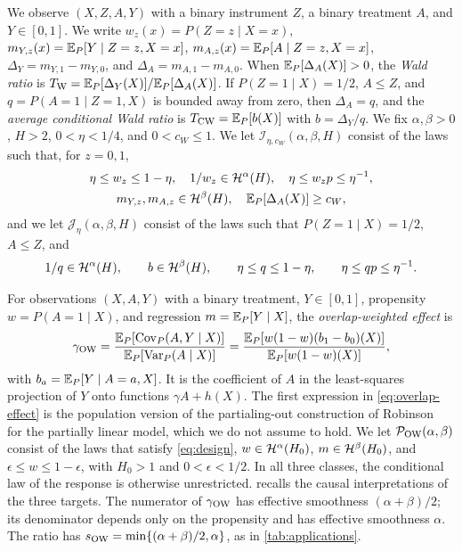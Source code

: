 We observe $(X,Z,A,Y)$ with a binary instrument $Z$, a binary treatment
$A$, and $Y\in[0,1]$.
We write $w_z(x)=P(Z=z\mid X=x)$,
$m_{Y,z}(x)=\mathbb E_P[Y\mid Z=z,X=x]$, $m_{A,z}(x)=\mathbb E_P[A\mid Z=z,X=x]$,
$\Delta_Y=m_{Y,1}-m_{Y,0}$, and $\Delta_A=m_{A,1}-m_{A,0}$. When
$\mathbb E_P[\Delta_A(X)]>0$, the \emph{Wald ratio} is
$T_{\rm W}=\mathbb E_P[\Delta_Y(X)]/\mathbb E_P[\Delta_A(X)]$. If $P(Z=1\mid X)=1/2$,
$A\le Z$, and $q=P(A=1\mid Z=1,X)$ is bounded away from zero, then
$\Delta_A=q$, and the \emph{average conditional Wald ratio} is
$T_{\rm CW}=\mathbb E_P[b(X)]$ with $b=\Delta_Y/q$. We fix $\alpha,\beta>0$,
$H>2$, $0<\eta<1/4$, and $0<c_W\le1$. We let
$\mathcal I_{\eta,c_W}(\alpha,\beta,H)$ consist of the laws such that,
for $z=0,1$,
\[
 \begin{gathered}
 \eta\le w_z\le1-\eta,\quad 1/w_z\in\mathcal H^\alpha(H),\quad
 \eta\le w_zp\le\eta^{-1},\\
 m_{Y,z},m_{A,z}\in\mathcal H^\beta(H),
 \quad \mathbb E_P[\Delta_A(X)]\ge c_W,
 \end{gathered}
\]
and we let $\mathcal J_\eta(\alpha,\beta,H)$ consist of the laws such
that $P(Z=1\mid X)=1/2$, $A\le Z$, and
\[
 1/q\in\mathcal H^\alpha(H),\qquad b\in\mathcal H^\beta(H),\qquad
 \eta\le q\le1-\eta,\qquad \eta\le qp\le\eta^{-1}.
\]

For observations $(X,A,Y)$ with a binary treatment, $Y\in[0,1]$,
propensity $w=P(A=1\mid X)$, and regression $m=\mathbb E_P[Y\mid X]$, the
\emph{overlap-weighted effect} is
\begin{equation}\label{eq:overlap-effect}
 \gamma_{\rm OW}=\frac{\mathbb E_P[\operatorname{Cov}_P(A,Y\mid X)]}{\mathbb E_P[\operatorname{Var}_P(A\mid X)]}
 =\frac{\mathbb E_P[w(1-w)(b_1-b_0)(X)]}{\mathbb E_P[w(1-w)(X)]},
\end{equation}
with $b_a=\mathbb E_P[Y\mid A=a,X]$. It is the coefficient of $A$ in the
least-squares projection of $Y$ onto functions $\gamma A+h(X)$. The first
expression in \eqref{eq:overlap-effect} is the population version of the
partialing-out construction of Robinson~\cite{robinson} for the
partially linear model, which we do not assume to hold. We let
$\mathcal P_{\rm OW}(\alpha,\beta)$ consist of the laws that satisfy
\eqref{eq:design}, $w\in\mathcal H^\alpha(H_0)$, $m\in\mathcal H^\beta(H_0)$, and
$\epsilon\le w\le1-\epsilon$, with $H_0>1$ and $0<\epsilon<1/2$. In all
three classes, the conditional law of the response is otherwise
unrestricted.  recalls the causal
interpretations of the three targets. The numerator of $\gamma_{\rm OW}$
has effective smoothness $(\alpha+\beta)/2$; its denominator depends only
on the propensity and has effective smoothness $\alpha$. The ratio has
$s_{\rm OW}=\min\{(\alpha+\beta)/2,\alpha\}$, as in \cref{tab:applications}.
